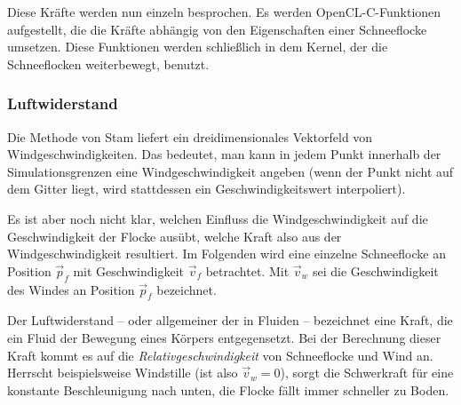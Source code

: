 Diese Kräfte werden nun einzeln besprochen. Es werden
OpenCL-C-Funktionen aufgestellt, die die Kräfte abhängig von den
Eigenschaften einer Schneeflocke umsetzen. Diese Funktionen werden
schließlich in dem Kernel, der die Schneeflocken weiterbewegt,
benutzt.

\subsubsection{Luftwiderstand}

Die Methode von Stam liefert ein dreidimensionales Vektorfeld von
Windgeschwindigkeiten. Das bedeutet, man kann in jedem Punkt innerhalb der
Simulationsgrenzen eine Windgeschwindigkeit angeben (wenn der Punkt
nicht auf dem Gitter liegt, wird stattdessen ein Geschwindigkeitswert
interpoliert).

Es ist aber noch nicht klar, welchen Einfluss die Windgeschwindigkeit
auf die Geschwindigkeit der Flocke ausübt, welche Kraft also aus der
Windgeschwindigkeit resultiert. Im Folgenden wird eine einzelne
Schneeflocke an Position $\vec{p}_f$ mit Geschwindigkeit $\vec{v}_{f}$
betrachtet. Mit $\vec{v}_w$ sei die Geschwindigkeit des Windes an
Position $\vec{p}_f$ bezeichnet.

Der Luftwiderstand -- oder allgemeiner der
 in Fluiden -- bezeichnet eine
Kraft, die ein Fluid der Bewegung eines Körpers entgegensetzt. Bei der
Berechnung dieser Kraft kommt es auf die \emph{Relativgeschwindigkeit}
von Schneeflocke und Wind an. Herrscht beispielsweise Windstille (ist
also $\vec{v}_w = 0$), sorgt die Schwerkraft für eine konstante
Beschleunigung nach unten, die Flocke fällt immer schneller zu Boden.

